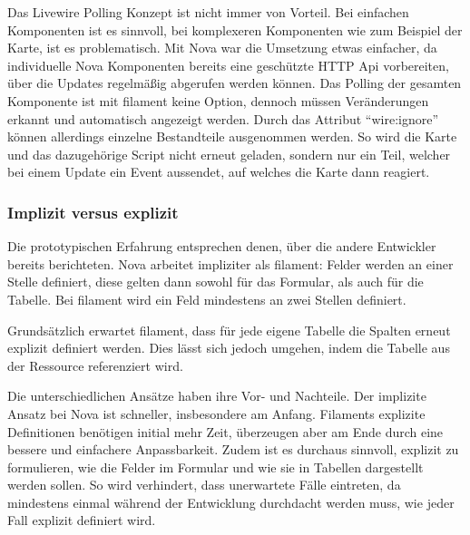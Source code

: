 Das Livewire Polling Konzept ist nicht immer von Vorteil.
Bei einfachen Komponenten ist es sinnvoll, bei komplexeren Komponenten wie zum Beispiel der Karte, ist es problematisch.
Mit Nova war die Umsetzung etwas einfacher, da individuelle Nova Komponenten bereits eine geschützte HTTP Api vorbereiten, über die Updates regelmäßig abgerufen werden können.
Das Polling der gesamten Komponente ist mit filament keine Option, dennoch müssen Veränderungen erkannt und automatisch angezeigt werden.
Durch das Attribut \enquote{wire:ignore} können allerdings einzelne Bestandteile ausgenommen werden.
So wird die Karte und das dazugehörige Script nicht erneut geladen, sondern nur ein Teil, welcher bei einem Update ein Event aussendet, auf welches die Karte dann reagiert.

\newpage

\subsubsection{Implizit versus explizit}
Die prototypischen Erfahrung entsprechen denen, über die andere Entwickler\cite{reddit-laravel-nova-vs-filament} bereits berichteten.
Nova arbeitet impliziter als filament:
Felder werden an einer Stelle definiert, diese gelten dann sowohl für das Formular, als auch für die Tabelle.
Bei filament wird ein Feld mindestens an zwei Stellen definiert.

Grundsätzlich erwartet filament, dass für jede eigene Tabelle die Spalten erneut explizit definiert werden.
Dies lässt sich jedoch umgehen, indem die Tabelle aus der Ressource referenziert wird.

Die unterschiedlichen Ansätze haben ihre Vor- und Nachteile.
Der implizite Ansatz bei Nova ist schneller, insbesondere am Anfang.
Filaments explizite Definitionen benötigen initial mehr Zeit, überzeugen aber am Ende durch eine bessere und einfachere Anpassbarkeit.
Zudem ist es durchaus sinnvoll, explizit zu formulieren, wie die Felder im Formular und wie sie in Tabellen dargestellt werden sollen.
So wird verhindert, dass unerwartete Fälle eintreten, da mindestens einmal während der Entwicklung durchdacht werden muss, wie jeder Fall explizit definiert wird.
